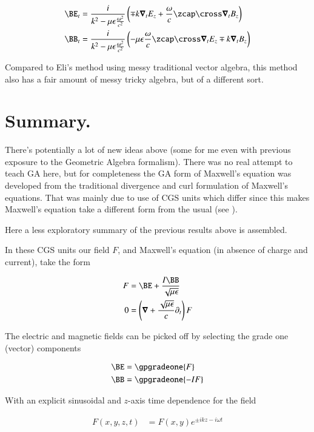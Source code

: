 \begin{align}\label{eqn:transverseField:transversePair}
\BE_t &= \frac{i}{k^2 - \mu\epsilon\frac{\omega^2}{c^2}} \left( \mp k \spacegrad_t E_z + \frac{\omega}{c} \zcap \cross \spacegrad_t B_z \right) \\
\BB_t &= \frac{i}{k^2 - \mu\epsilon\frac{\omega^2}{c^2}} \left( - {\mu\epsilon}\frac{\omega}{c} \zcap \cross \spacegrad_t E_z \mp k \spacegrad_t B_z \right) 
\end{align}

Compared to Eli's method using messy traditional vector algebra, this method also has a fair amount of messy tricky algebra, but of a different sort.

\section{Summary.}

There's potentially a lot of new ideas above (some for me even with previous exposure to the Geometric Algebra formalism).  There was no real attempt to teach GA here, but for completeness the GA form of Maxwell's equation was developed from the traditional divergence and curl formulation of Maxwell's equations.  That was mainly due to use of CGS units which differ since this makes Maxwell's equation take a different form from the usual (see \cite{doran2003gap}).

Here a less exploratory summary of the previous results above is assembled.

In these CGS units our field $F$, and Maxwell's equation (in absence of charge and current), take the form

\begin{align}\label{eqn:transverseField:foo2}
F &= \BE + \frac{I\BB}{\sqrt{\mu\epsilon}} \\
0 &= \left(\spacegrad + \frac{\sqrt{\mu\epsilon}}{c}\partial_t\right) F 
\end{align}

The electric and magnetic fields can be picked off by selecting the grade one (vector) components

\begin{align}\label{eqn:transverseField:foo8}
\BE &= \gpgradeone{F} \\
\BB &= \gpgradeone{-I F}
\end{align}

With an explicit sinusoidal and $z$-axis time dependence for the field

\begin{align}\label{eqn:transverseField:foo3}
F(x,y,z,t) &= F(x,y) e^{\pm i k z - i \omega t} 
\end{align}

